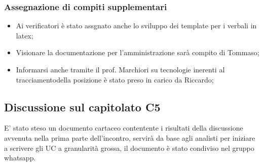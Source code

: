 \subsubsection{Assegnazione di compiti supplementari}
\begin{itemize}
\item Ai verificatori è stato assgnato anche lo sviluppo dei template per i verbali in latex;
\item Visionare la documentazione per l'amministrazione sarà compito di Tommaso;
\item Informarsi anche tramite il prof. Marchiori su tecnologie inerenti al tracciamentodella posizione è stato preso in carico da Riccardo;
\end{itemize}
\subsection{Discussione sul capitolato C5}
E' stato steso un documento cartaceo contentente i risultati della discussione avvenuta nella prima parte dell'incontro, servirà da base agli analisti per iniziare a 
scrivere gli UC a granularità grossa, il documento è stato condiviso nel gruppo whatsapp.
\clearpage